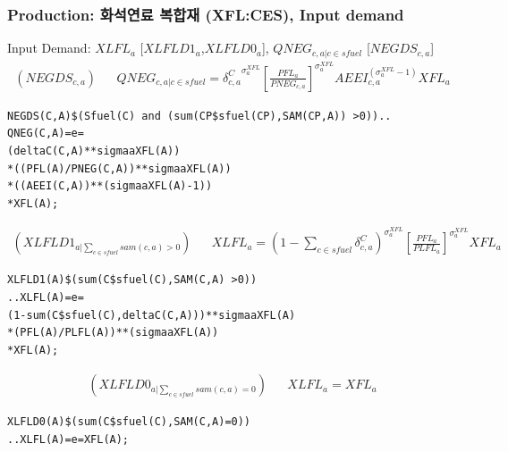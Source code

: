 \documentclass[10pt,compress,slidetop,%
			   hyperref={unicode},xcolor={svgnames},%
			   t]{beamer}
\begin{document}
\begin{frame}[fragile]
\frametitle{Production: 화석연료 복합재 (XFL:CES), Input demand}
\begin{scriptsize}
Input Demand: $XLFL_a$ [$XLFLD1_a$,$XLFLD0_a$], $QNEG_{c,a|c\in sfuel}$ [$NEGDS_{c,a}$] 
\begin{eqnarray*}
(NEGDS_{c,a})& &QNEG_{c,a|c\in sfuel}={\delta^C_{c,a}}^{\sigma^{XFL}_a}\left[\frac{PFL_a}{PNEG_{c,a}}\right]^{\sigma^{XFL}_a}AEEI_{c,a}^{(\sigma^{XFL}_a-1)}XFL_a
\end{eqnarray*}

\begin{verbatim}
NEGDS(C,A)$(Sfuel(C) and (sum(CP$sfuel(CP),SAM(CP,A)) >0))..
QNEG(C,A)=e=                
(deltaC(C,A)**sigmaaXFL(A))
*((PFL(A)/PNEG(C,A))**sigmaaXFL(A))
*((AEEI(C,A))**(sigmaaXFL(A)-1))
*XFL(A);
\end{verbatim}

\begin{eqnarray*}
(XLFLD1_{a|\sum_{c\in sfuel}sam(c,a)>0})& &XLFL_a={(1-\sum_{c\in sfuel}\delta^C_{c,a})}^{\sigma^{XFL}_a}\left[\frac{PFL_a}{PLFL_{a}}\right]^{\sigma^{XFL}_a}XFL_a
\end{eqnarray*}

\begin{verbatim}
XLFLD1(A)$(sum(C$sfuel(C),SAM(C,A) >0))
..XLFL(A)=e=
(1-sum(C$sfuel(C),deltaC(C,A)))**sigmaaXFL(A)
*(PFL(A)/PLFL(A))**(sigmaaXFL(A))
*XFL(A);
\end{verbatim}

\begin{eqnarray*}
(XLFLD0_{a|\sum_{c\in sfuel}sam(c,a)=0})& &XLFL_a=XFL_a
\end{eqnarray*}


\begin{verbatim}
XLFLD0(A)$(sum(C$sfuel(C),SAM(C,A)=0))
..XLFL(A)=e=XFL(A);
\end{verbatim}

\end{scriptsize}
\end{frame}
\end{document}

